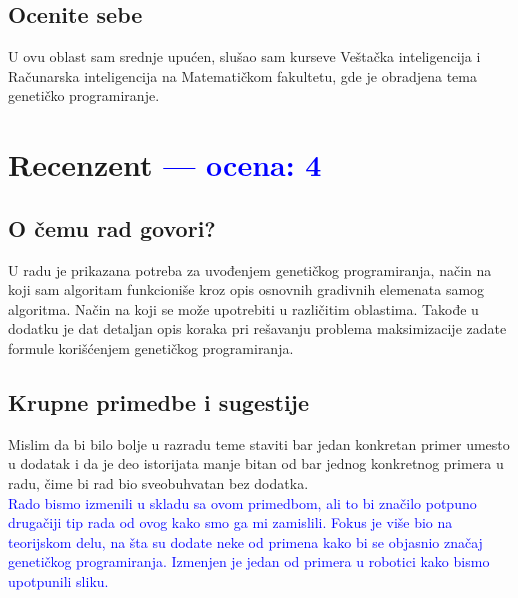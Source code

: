 \documentclass[a4paper]{report}
\newcommand{\odgovor}[1]{\textcolor{blue}{#1}}
\begin{document}
\section{Ocenite sebe}

U ovu oblast sam srednje upućen, slušao sam kurseve Veštačka inteligencija i Računarska inteligencija na Matematičkom fakultetu, gde je obradjena tema genetičko programiranje.


\chapter{Recenzent \odgovor{--- ocena: 4} }


\section{O čemu rad govori?}
U radu je prikazana potreba za uvođenjem genetičkog programiranja, način na koji sam algoritam funkcioniše kroz opis osnovnih gradivnih elemenata samog algoritma. Način na koji se može upotrebiti u različitim oblastima.
Takođe u dodatku je dat detaljan opis koraka pri rešavanju problema maksimizacije zadate formule korišćenjem genetičkog programiranja. 

\section{Krupne primedbe i sugestije}
Mislim da bi bilo bolje u razradu teme staviti bar jedan konkretan primer umesto u dodatak i da je deo istorijata manje bitan od bar jednog konkretnog primera u radu, čime bi rad bio sveobuhvatan bez dodatka.\\
\odgovor{Rado bismo izmenili u skladu sa ovom primedbom, ali to bi značilo potpuno drugačiji tip rada od ovog kako smo ga mi zamislili. Fokus je više bio na teorijskom delu, na šta su dodate neke od primena kako bi se objasnio značaj genetičkog programiranja. Izmenjen je jedan od primera u robotici kako bismo upotpunili sliku.}
\end{document}
